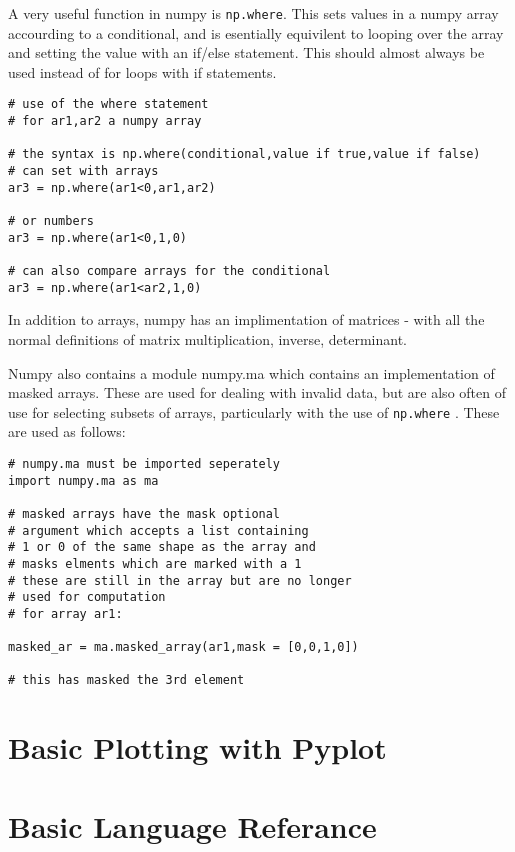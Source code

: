 \documentclass[11pt,a4paper]{article}
\begin{document}
A very useful function in numpy is \verb|np.where|. This sets values in a numpy array accourding to a conditional, and is esentially equivilent to looping over the array and setting the value with an if/else statement. This should almost always be used instead of for loops with if statements. 

\begin{verbatim}
# use of the where statement
# for ar1,ar2 a numpy array

# the syntax is np.where(conditional,value if true,value if false)
# can set with arrays
ar3 = np.where(ar1<0,ar1,ar2)

# or numbers
ar3 = np.where(ar1<0,1,0)

# can also compare arrays for the conditional
ar3 = np.where(ar1<ar2,1,0)

\end{verbatim} 

In addition to arrays, numpy has an implimentation of matrices - with all the normal definitions of matrix multiplication, inverse, determinant.

Numpy also contains a module numpy.ma which contains an implementation of masked arrays. These are used for dealing with invalid data, but are also often of use for selecting subsets of arrays, particularly with the use of \verb|np.where| . These are used as follows:

\begin{verbatim}
# numpy.ma must be imported seperately
import numpy.ma as ma

# masked arrays have the mask optional
# argument which accepts a list containing
# 1 or 0 of the same shape as the array and
# masks elments which are marked with a 1
# these are still in the array but are no longer
# used for computation 
# for array ar1:

masked_ar = ma.masked_array(ar1,mask = [0,0,1,0])

# this has masked the 3rd element

\end{verbatim}

\section{Basic Plotting with Pyplot}

\appendix

\section{Basic Language Referance}
\end{document}
